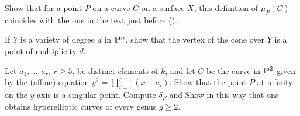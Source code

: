 {{\begin{description}[style=multiline,labelwidth=1.8em,leftmargin=2.15em,itemsep=3pt,topsep=0pt,parsep=0pt]
\begin{parts}
\item Show that for a point $P$ on a curve $C$ on a surface $X$, this definition of $\mu_P(C)$ coincides with the one in the text just before ().
\item If $Y$ is a variety of degree $d$ in $\mathbf{P}^n$, show that the vertex of the cone over $Y$ is a point of multiplicity $d$.
\end{parts}
\item[\hypertarget{ex-V-3.5}{}3.5.] Let $a_1,\ldots,a_r$, $r\ge5$, be distinct elements of $k$, and let $C$ be the curve in $\mathbf{P}^2$ given by the (affine) equation $y^2=\prod_{i=1}^r(x-a_i)$. Show that the point $P$ at infinity on the $y$-axis is a singular point. Compute $\delta_P$ and  Show in this way that one obtains hyperelliptic curves of every genus $g\ge2$.
\end{description}
}
}
